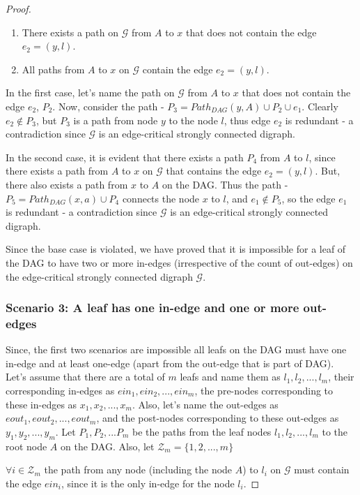 \documentclass[runningheads]{llncs}
\begin{document}
\begin{proof}
\begin{enumerate}
    \item There exists a path on $\mathcal{G}$ from $A$ to $x$ that does not contain the edge $e_2 = (y, l)$.
    \item All paths from $A$ to $x$ on $\mathcal{G}$ contain the edge $e_2 = (y, l)$.
\end{enumerate}

In the first case, let's name the path on $\mathcal{G}$ from $A$ to $x$ that does not contain the edge $e_2$, $P_2$. Now, consider the path - $P_3 = Path_{DAG}(y, A) \cup P_2 \cup e_1$. Clearly $e_2 \notin P_3$, but $P_3$ is a path from node $y$ to the node $l$, thus edge $e_2$ is redundant - a contradiction since $\mathcal{G}$ is an edge-critical strongly connected digraph.

In the second case, it is evident that there exists a path $P_4$ from $A$ to $l$, since there exists a path from $A$ to $x$ on $\mathcal{G}$ that contains the edge $e_2 = (y, l)$. But, there also exists a path from $x$ to $A$ on the DAG. Thus the path - $P_5 = Path_{DAG}(x, a) \cup P_4$ connects the node $x$ to $l$, and $e_1 \notin P_5$, so the edge $e_1$ is redundant - a contradiction since $\mathcal{G}$ is an edge-critical strongly connected digraph.

Since the base case is violated, we have proved that it is impossible for a leaf of the DAG to have two or more in-edges (irrespective of the count of out-edges) on the edge-critical strongly connected digraph $\mathcal{G}$.

\subsubsection{Scenario 3: A leaf has one in-edge and one or more out-edges} Since, the first two scenarios are impossible all leafs on the DAG must have one in-edge and at least one-edge (apart from the out-edge that is part of DAG). Let's assume that there are a total of $m$ leafs and name them as $l_1, l_2, ... , l_m$, their corresponding in-edges as $ein_1, ein_2, ... , ein_m$, the pre-nodes corresponding to these in-edges as $x_1, x_2, ... , x_m$. Also, let's name the out-edges as $eout_1, eout_2, ... , eout_m$, and the post-nodes corresponding to these out-edges as $y_1, y_2, ... , y_m$. Let $P_1, P_2, ... P_m$ be the paths from the leaf nodes $l_1, l_2, ..., l_m$ to the root node $A$ on the DAG. Also, let $\mathcal{Z}_m = \{1, 2, ..., m\}$

$\forall i \in \mathcal{Z}_m$ the path from any node (including the node $A$) to $l_i$  on $\mathcal{G}$ must contain the edge $ein_i$, since it is the only in-edge for the node $l_i$.


\end{proof}
\end{document}
